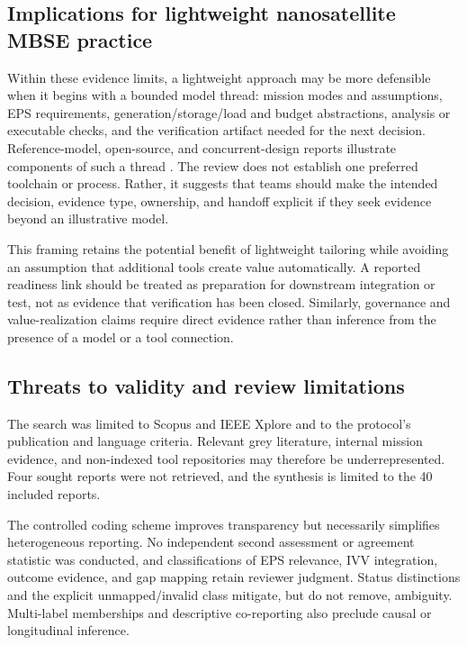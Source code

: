 \documentclass[alpha-refs]{wiley-article}
\begin{document}
\subsection{Implications for lightweight nanosatellite MBSE practice}

Within these evidence limits, a lightweight approach may be more defensible when it begins with a bounded model thread: mission modes and assumptions, EPS requirements, generation/storage/load and budget abstractions, analysis or executable checks, and the verification artifact needed for the next decision.  Reference-model, open-source, and concurrent-design reports illustrate components of such a thread \cite{paper-0026,paper-0029,paper-0037,paper-0043,paper-0078}.  The review does not establish one preferred toolchain or process.  Rather, it suggests that teams should make the intended decision, evidence type, ownership, and handoff explicit if they seek evidence beyond an illustrative model.

This framing retains the potential benefit of lightweight tailoring while avoiding an assumption that additional tools create value automatically.  A reported readiness link should be treated as preparation for downstream integration or test, not as evidence that verification has been closed.  Similarly, governance and value-realization claims require direct evidence rather than inference from the presence of a model or a tool connection.

\subsection{Threats to validity and review limitations}

The search was limited to Scopus and IEEE Xplore and to the protocol's publication and language criteria.  Relevant grey literature, internal mission evidence, and non-indexed tool repositories may therefore be underrepresented.  Four sought reports were not retrieved, and the synthesis is limited to the 40 included reports.

The controlled coding scheme improves transparency but necessarily simplifies heterogeneous reporting.  No independent second assessment or agreement statistic was conducted, and classifications of EPS relevance, IVV integration, outcome evidence, and gap mapping retain reviewer judgment.  Status distinctions and the explicit unmapped/invalid class mitigate, but do not remove, ambiguity.  Multi-label memberships and descriptive co-reporting also preclude causal or longitudinal inference.
\end{document}

